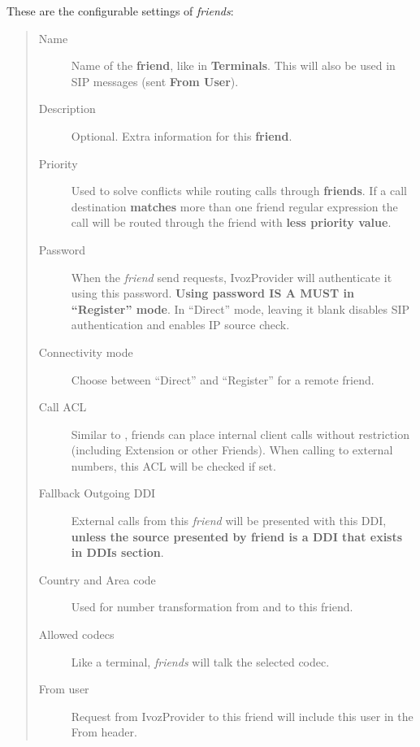 \documentclass[letterpaper,10pt,spanish]{sphinxmanual}
\begin{document}
These are the configurable settings of \emph{friends}:
\begin{quote}
\begin{description}
\item[{Name}] \leavevmode
Name of the \textbf{friend}, like in \textbf{Terminals}. This will also be used
in SIP messages (sent \textbf{From User}).

\item[{Description}] \leavevmode
Optional. Extra information for this \textbf{friend}.

\item[{Priority}] \leavevmode
Used to solve conflicts while routing calls through \textbf{friends}.
If a call destination \textbf{matches} more than one friend regular expression
the call will be routed through the friend with \textbf{less priority value}.

\item[{Password}] \leavevmode
When the \emph{friend} send requests, IvozProvider will authenticate it using
this password. \textbf{Using password IS A MUST in ``Register'' mode}. In ``Direct'' mode,
leaving it blank disables SIP authentication and enables IP source check.

\item[{Connectivity mode}] \leavevmode
Choose between ``Direct'' and ``Register'' for a remote friend.

\item[{Call ACL}] \leavevmode
Similar to {\hyperref[administration_portal/client/vpbx/users:users]{}}, friends can place internal
client calls without restriction (including Extension or other Friends).
When calling to external numbers, this ACL will be checked if set.

\item[{Fallback Outgoing DDI}] \leavevmode
External calls from this \emph{friend} will be presented with this DDI, \textbf{unless
the source presented by friend is a DDI that exists in DDIs section}.

\item[{Country and Area code}] \leavevmode
Used for number transformation from and to this friend.

\item[{Allowed codecs}] \leavevmode
Like a terminal, \emph{friends} will talk the selected codec.

\item[{From user}] \leavevmode
Request from IvozProvider to this friend will include this user in
the From header.


\end{description}
\end{quote}
\end{document}
